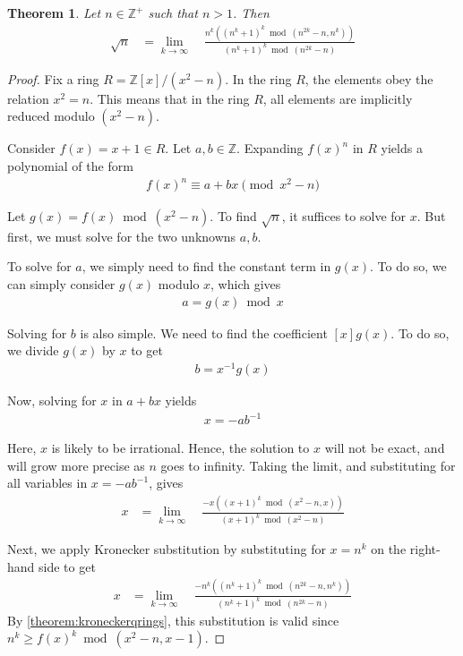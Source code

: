 \documentclass[12pt,reqno]{article}
\theoremstyle{plain}
\newtheorem{theorem}{Theorem}
\theoremstyle{definition}
\begin{document}
\begin{theorem} \label{theorem:squareroots}
Let $n \in \mathbb{Z}^+$ such that $n > 1$. Then
\begin{align*}
\sqrt{n} &= \lim_{k\rightarrow\infty} \quad
    \frac{n^k ((n^k + 1)^k \bmod{(n^{2k}-n, n^k)})}
        {(n^k + 1)^k \bmod{(n^{2k}-n)}}
\end{align*}
\end{theorem}
\begin{proof}
Fix a ring $R = \mathbb{Z}[x]/(x^2 - n)$. In the ring $R$, the elements obey the relation $x^2 = n$. This means that in the ring $R$, all elements are implicitly reduced modulo $(x^2 - n)$.

Consider $f(x) = x+1 \in R$. Let $a,b \in \mathbb{Z}$. Expanding $f(x)^n$ in $R$ yields a polynomial of the form
\begin{align*}
f(x)^n \equiv a + b x \pmod{x^2 - n}
\end{align*}

Let $g(x) = f(x) \bmod{(x^2-n)}$. To find $\sqrt{n}$, it suffices to solve for $x$. But first, we must solve for the two unknowns $a,b$.

To solve for $a$, we simply need to find the constant term in $g(x)$. To do so, we can simply consider $g(x)$ modulo $x$, which gives
\begin{align*}
a = g(x) \bmod{x}
\end{align*}

Solving for $b$ is also simple. We need to find the coefficient $[x] g(x)$. To do so, we divide $g(x)$ by $x$ to get
\begin{align*}
b = x^{-1} g(x)
\end{align*}

Now, solving for $x$ in $a + b x$ yields
\begin{align*}
x = -a b^{-1}
\end{align*}

Here, $x$ is likely to be irrational. Hence, the solution to $x$ will not be exact, and will grow more precise as $n$ goes to infinity. Taking the limit, and substituting for all variables in $x = -a b^{-1}$, gives
\begin{align*}
x &= \lim_{k\rightarrow\infty} \quad
    \frac{-x ((x + 1)^k \bmod{(x^{2}-n, x)})}
        {(x + 1)^k \bmod{(x^{2}-n)}}
\end{align*}

Next, we apply Kronecker substitution by substituting for $x = n^k$ on the right-hand side to get
\begin{align*}
x &= \lim_{k\rightarrow\infty} \quad
    \frac{-n^k ((n^k + 1)^k \bmod{(n^{2k}-n, n^k)})}
        {(n^k + 1)^k \bmod{(n^{2k}-n)}}
\end{align*}
By \cref{theorem:kroneckerqrings}, this substitution is valid since $n^k \geq f(x)^k \bmod{(x^2-n,x-1)}$.


\end{proof}
\end{document}
